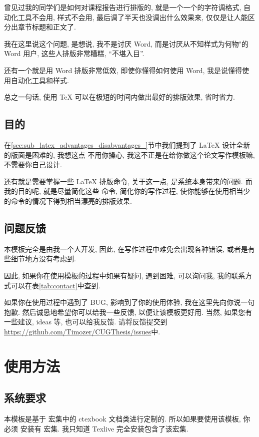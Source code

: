 \documentclass[bachelor]{cugthesis}
\begin{document}
    曾见过我的同学们是如何对课程报告进行排版的, 就是一个一个的字符调格式, 自动化工具不会用, 样式不会用,
    最后调了半天也没调出什么效果来, 仅仅是让人能区分出章节标题和正文了.

    我在这里说这个问题, 是想说, 我不是讨厌 Word, 而是讨厌从不知样式为何物"的 Word 用户, 这些人排版非常糟糕,
    ``不堪入目''.

    还有一个就是用 Word 排版非常低效, 即使你懂得如何使用 Word, 我是说懂得使用自动化工具和样式.

    总之一句话, 使用 \TeX{} 可以在极短的时间内做出最好的排版效果, 省时省力.

\section{目的}
\label{sec:mu_di_}
    在\ref{sec:sub_latex_advantages_disabvantages_}节中我们提到了 \LaTeX{} 设计全新的版面是困难的, 我想这点
    不用你操心, 我这不正是在给你做这个论文写作模板嘛, 不需要你自己设计.

    还有就是需要掌握一些 \LaTeX{} 排版命令, 关于这一点, 是系统本身带来的问题. 而我的目的呢, 就是尽量简化这些
    命令, 简化你的写作过程, 使你能够在使用相当少的命令的情况下得到相当漂亮的排版效果.

\section{问题反馈}
\label{sec:wen_ti_fan_kui_}
    本模板完全是由我一个人开发, 因此, 在写作过程中难免会出现各种错误, 或者是有些细节地方没有考虑到.

    因此, 如果你在使用模板的过程中如果有疑问, 遇到困难, 可以询问我, 我的联系方式可以在表\ref{tab:contact}中查到.
    
    如果你在使用过程中遇到了 BUG, 影响到了你的使用体验, 我在这里先向你说一句抱歉.
    然后诚恳地希望你可以给我一些反馈, 以便让该模板更好用. 当然, 如果您有一些建议, ideas 等, 也可以给我反馈. 
    请将反馈提交到
    \url{https://github.com/Timozer/CUGThesis/issues}中.


\chapter{使用方法}

\section{系统要求}
\label{sec:xi_tong_yao_qiu_}
本模板是基于 \CTeX{} 宏集中的 ctexbook 文档类进行定制的. 所以如果要使用该模板, 你必须
安装有 \CTeX{} 宏集. 我只知道 Texlive 完全安装包含了该宏集.
\end{document}
